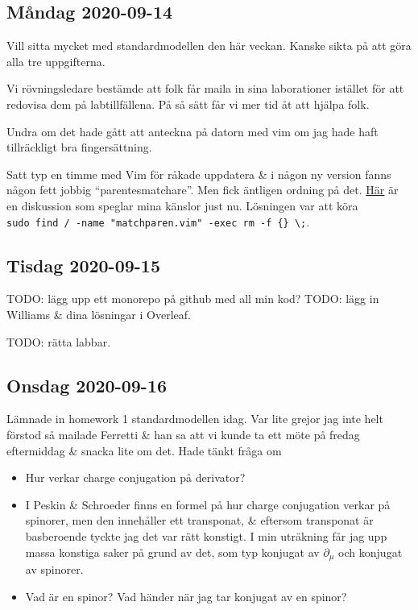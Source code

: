\subsection{Måndag 2020-09-14}

Vill sitta mycket med standardmodellen den här veckan. Kanske sikta på att göra alla tre uppgifterna.

\bigskip

Vi rövningsledare bestämde att folk får maila in sina laborationer istället för att redovisa dem på labtillfällena. På så sätt får vi mer tid åt att hjälpa folk.

\bigskip

Undra om det hade gått att anteckna på datorn med vim om jag hade haft tillräckligt bra fingersättning.

Satt typ en timme med Vim för råkade uppdatera \& i någon ny version fanns någon fett jobbig \enquote{parentesmatchare}. Men fick äntligen ordning på det. \href{https://vimrc-dissection.blogspot.com/2006/08/vim-turn-that-showmatch-crap.html}{\color{blue}Här} är en diskussion som speglar mina känslor just nu. Lösningen var att köra\\ \verb|sudo find / -name "matchparen.vim" -exec rm -f {} \;|.

\subsection{Tisdag 2020-09-15}

TODO: lägg upp ett monorepo på github med all min kod?
TODO: lägg in Williams \& dina lösningar i Overleaf. \checkmark

TODO: rätta labbar. \checkmark


\subsection{Onsdag 2020-09-16}

Lämnade in homework 1 standardmodellen idag. Var lite grejor jag inte helt förstod så mailade Ferretti \& han sa att vi kunde ta ett möte på fredag eftermiddag \& snacka lite om det. Hade tänkt fråga om
\begin{itemize}
    \item Hur verkar charge conjugation på derivator?
    \item I Peskin \& Schroeder finns en formel på hur charge conjugation verkar på spinorer, men den innehåller ett transponat, \& eftersom transponat är basberoende tyckte jag det var rätt konstigt. I min uträkning får jag upp massa konstiga saker på grund av det, som typ konjugat av $\partial_\mu$ och konjugat av spinorer.
    \item Vad är en spinor? Vad händer när jag tar konjugat av en spinor?
\end{itemize}



